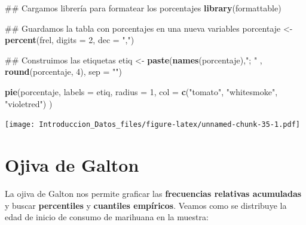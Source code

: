 \documentclass[spanish,]{book}
\newenvironment{Shaded}{\begin{snugshade}}{\end{snugshade}}
\newcommand{\KeywordTok}[1]{\textcolor[rgb]{0.13,0.29,0.53}{\textbf{#1}}}
\newcommand{\DataTypeTok}[1]{\textcolor[rgb]{0.13,0.29,0.53}{#1}}
\newcommand{\DecValTok}[1]{\textcolor[rgb]{0.00,0.00,0.81}{#1}}
\newcommand{\StringTok}[1]{\textcolor[rgb]{0.31,0.60,0.02}{#1}}
\newcommand{\OperatorTok}[1]{\textcolor[rgb]{0.81,0.36,0.00}{\textbf{#1}}}
\newcommand{\NormalTok}[1]{#1}
\begin{document}
\begin{Shaded}
\begin{Highlighting}[]
\NormalTok{## Cargamos librería para formatear los porcentajes}
\KeywordTok{library}\NormalTok{(formattable)}

\NormalTok{## Guardamos la tabla con porcentajes en una nueva variables}
\NormalTok{porcentaje <-}\StringTok{ }\KeywordTok{percent}\NormalTok{(frel, }\DataTypeTok{digits =} \DecValTok{2}\NormalTok{, }\DataTypeTok{dec =} \StringTok{","}\NormalTok{)}

\NormalTok{## Construimos las etiquetas}
\NormalTok{etiq <-}\StringTok{ }\KeywordTok{paste}\NormalTok{(}\KeywordTok{names}\NormalTok{(porcentaje),}\StringTok{"; "}\NormalTok{ , }\KeywordTok{round}\NormalTok{(porcentaje, }\DecValTok{4}\NormalTok{), }\DataTypeTok{sep =} \StringTok{""}\NormalTok{)}

\KeywordTok{pie}\NormalTok{(porcentaje,}
    \DataTypeTok{labels =}\NormalTok{ etiq,}
    \DataTypeTok{radius =} \DecValTok{1}\NormalTok{,}
    \DataTypeTok{col =} \KeywordTok{c}\NormalTok{(}\StringTok{"tomato"}\NormalTok{, }\StringTok{"whitesmoke"}\NormalTok{, }\StringTok{"violetred"}\NormalTok{)}
\NormalTok{    )}
\end{Highlighting}
\end{Shaded}

\texttt{[image: Introduccion\_Datos\_files/figure-latex/unnamed-chunk-35-1.pdf]}

\section{Ojiva de Galton}\label{ojiva-de-galton}

La ojiva de Galton nos permite graficar las \textbf{frecuencias
relativas acumuladas} y buscar \textbf{percentiles} y \textbf{cuantiles
empíricos}. Veamos como se distribuye la edad de inicio de consumo de
marihuana en la muestra:

\begin{Shaded}
\end{Shaded}
\end{document}
